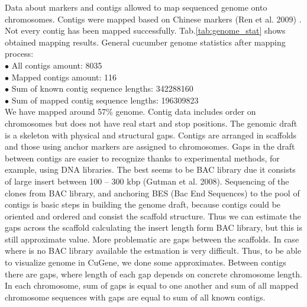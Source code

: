 \documentclass[a4paper]{spie}
\newcommand{\appName}{CuGene}
\begin{document}
Data about markers and contigs allowed to map sequenced genome onto chromosomes. Contigs were mapped based on Chinese markers (Ren et al. 2009) . Not every contig has been mapped successfully. Tab.\ref{tab:genome_stat} shows obtained mapping results.
General cucumber genome statistics after mapping process:\\
$\bullet$ All contigs amount: 8035 \\
$\bullet$ Mapped contigs amount: 116 \\
$\bullet$ Sum of known contig sequence lengths: 342288160 \\
$\bullet$ Sum of mapped contig sequence lengths: 196309823 \\
We have mapped around 57\% genome. Contig data includes order on chromosomes but does not have real start and stop positions. The genomic draft is a skeleton with physical and structural gaps. Contigs  are arranged in scaffolds and those using anchor markers are assigned to chromosomes. Gaps in the draft between contigs are easier to recognize thanks to experimental methods, for example, using DNA libraries. The best seems to be BAC library due it consists of large insert  between 100 – 300 kbp (Gutman et al. 2008). Sequencing of the clones from BAC library, and anchoring BES (Bac End Sequences) to the pool of contigs is basic steps in building the genome draft, because contigs could be oriented and ordered and consist the scaffold structure. Thus we can estimate the gaps across the scaffold calculating the insert length form BAC library, but this is still approximate value. More problematic are gaps between the scaffolds. In case where is no BAC library available the estmation is very difficult. Thus, to be able to visualize genome in \appName{}, we done some approximates. Between contigs there are gaps, where length of each gap depends on concrete chromosome length. In each chromosome, sum of gaps is equal to one another and sum of all mapped chromosome sequences with gaps are equal to sum of all known contigs.
\end{document}
